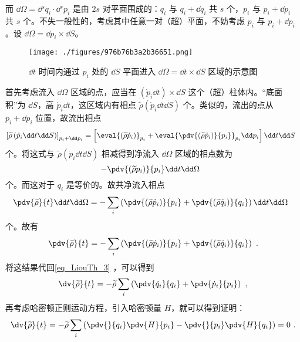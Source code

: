 而 $\dd \Omega = \dd{}^s q_i \cdot \dd{}^s p_i$ 是由 $2s$ 对平面围成的：$q_i$ 与 $q_i + \dd q_i$ 共 $s$ 个，$p_i$ 与 $p_i + \dd p_i$ 共 $s$ 个。不失一般性的，考虑其中任意一对（超）平面，不妨考虑 $p_i$ 与 $p_i+\dd p_i$ 。设 $\dd \Omega = \dd p_i \times \dd S$。
\begin{figure}[ht]
\centering
\texttt{[image: ./figures/976b76b3a2b36651.png]}
\caption{$\dd t$ 时间内通过 $p_i$ 处的 $\dd S$ 平面进入 $\dd \Omega = \dd t \times \dd S$ 区域的示意图} \label{fig_LiouTh_3}
\end{figure}
首先考虑流入 $\dd \Omega$ 区域的点，应当在 $\left(\dot p_i \dd t\right) \times \dd S$ 这个（超）柱体内。“底面积”为 $\dd S$，高 $\dot p_i \dd t$，这区域内有相点 $\widetilde \rho \left(\dot p_i \dd t \dd S \right)$ 个。类似的，流出的点从 $p_i + \dd p_i$ 位置，故流出相点
$$
\left[\widetilde \rho \left(\dot p_i \dd t \dd S\right)\right]_{p_i + \dd p_i} = \left[ \eval{\left(\widetilde\rho \dot p_i\right)}_{p_i} + \eval{\pdv{\left(\widetilde\rho \dot p_i\right)}{p_i}}_{p_i} \dd p_i \right] \dd t \dd S ~~
$$
个。将这式与 $\widetilde \rho \left(\dot p_i \dd t \dd S\right)$ 相减得到净流入 $\dd \Omega$ 区域的相点数为
\begin{equation}
- \pdv{\left(\widetilde \rho p_i\right)}{p_i} \dd t \dd \Omega ~~
\end{equation}
个。而这对于 $q_i$ 是等价的。故共净流入相点
\begin{equation}
\pdv{\widetilde \rho}{t} \dd t \dd \Omega = - \sum_{i} \left(\pdv{\left(\widetilde \rho \dot p_i\right)}{p_i} + \pdv{\left(\widetilde \rho \dot q_i\right)}{q_i}\right) \dd t \dd \Omega ~~
\end{equation}
个。故有
\begin{equation}\label{eq_LiouTh_2}
\pdv{\widetilde \rho}{t} = -\sum_{i} \left(\pdv{\left(\widetilde \rho \dot p_i\right)}{p_i} + \pdv{\left(\widetilde \rho \dot q_i\right)}{q_i}\right) ~.
\end{equation}
将这结果代回\autoref{eq_LiouTh_3} ，可以得到
\begin{equation}
\dv{\widetilde \rho}{t} = -\widetilde \rho \sum_{i} \left(\pdv{\dot q_i}{q_i} + \pdv{\dot p_i}{p_i}\right) ~,
\end{equation}
再考虑哈密顿正则运动方程，引入哈密顿量 $H$，就可以得到证明：
\begin{equation}\label{eq_LiouTh_4}
\dv{\widetilde \rho}{t} = -\widetilde \rho \sum_{i} \left(\pdv{}{q_i} \pdv{H}{p_i} - \pdv{}{p_i} \pdv{H}{q_i}\right) = 0 ~.
\end{equation}

